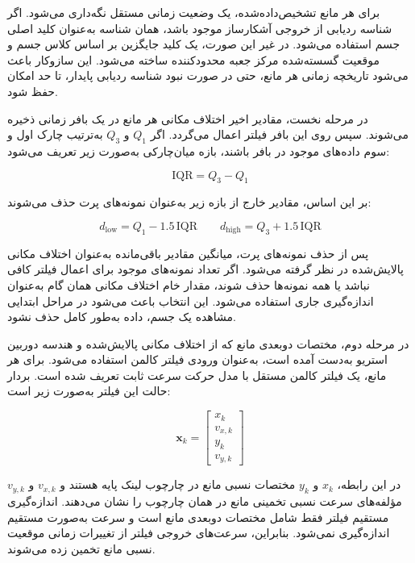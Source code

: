 برای هر مانع تشخیص‌داده‌شده، یک وضعیت زمانی مستقل نگه‌داری می‌شود. اگر شناسه ردیابی از خروجی آشکارساز  موجود باشد، همان شناسه به‌عنوان کلید اصلی جسم استفاده می‌شود. در غیر این صورت، یک کلید جایگزین بر اساس کلاس جسم و موقعیت گسسته‌شده مرکز جعبه محدودکننده ساخته می‌شود. این سازوکار باعث می‌شود تاریخچه زمانی هر مانع، حتی در صورت نبود شناسه ردیابی پایدار، تا حد امکان حفظ شود.

در مرحله نخست، مقادیر اخیر اختلاف مکانی هر مانع در یک بافر زمانی ذخیره می‌شوند. سپس روی این بافر فیلتر  اعمال می‌گردد. اگر \(Q_1\) و \(Q_3\) به‌ترتیب چارک اول و سوم داده‌های موجود در بافر باشند، بازه میان‌چارکی به‌صورت زیر تعریف می‌شود:

\begin{equation}
	\mathrm{IQR}=Q_3-Q_1
	\label{eq:iqr_definition}
\end{equation}

بر این اساس، مقادیر خارج از بازه زیر به‌عنوان نمونه‌های پرت حذف می‌شوند:

\begin{equation}
	d_{\mathrm{low}} = Q_1 - 1.5\,\mathrm{IQR}
	\qquad
	d_{\mathrm{high}} = Q_3 + 1.5\,\mathrm{IQR}
	\label{eq:iqr_bounds}
\end{equation}

پس از حذف نمونه‌های پرت، میانگین مقادیر باقی‌مانده به‌عنوان اختلاف مکانی پالایش‌شده در نظر گرفته می‌شود. اگر تعداد نمونه‌های موجود برای اعمال فیلتر کافی نباشد یا همه نمونه‌ها حذف شوند، مقدار خام اختلاف مکانی همان گام به‌عنوان اندازه‌گیری جاری استفاده می‌شود. این انتخاب باعث می‌شود در مراحل ابتدایی مشاهده یک جسم، داده به‌طور کامل حذف نشود.

در مرحله دوم، مختصات دوبعدی مانع که از اختلاف مکانی پالایش‌شده و هندسه دوربین استریو به‌دست آمده است، به‌عنوان ورودی فیلتر کالمن استفاده می‌شود. برای هر مانع، یک فیلتر کالمن مستقل با مدل حرکت سرعت ثابت تعریف شده است. بردار حالت این فیلتر به‌صورت زیر است:

\begin{equation}
	\mathbf{x}_k =
	\begin{bmatrix}
		x_k \\
		v_{x,k} \\
		y_k \\
		v_{y,k}
	\end{bmatrix}
	\label{eq:kalman_state_obstacle}
\end{equation}

در این رابطه، \(x_k\) و \(y_k\) مختصات نسبی مانع در چارچوب لینک پایه هستند و \(v_{x,k}\) و \(v_{y,k}\) مؤلفه‌های سرعت نسبی تخمینی مانع در همان چارچوب را نشان می‌دهند. اندازه‌گیری مستقیم فیلتر فقط شامل مختصات دوبعدی مانع است و سرعت به‌صورت مستقیم اندازه‌گیری نمی‌شود. بنابراین، سرعت‌های خروجی فیلتر از تغییرات زمانی موقعیت نسبی مانع تخمین زده می‌شوند.


